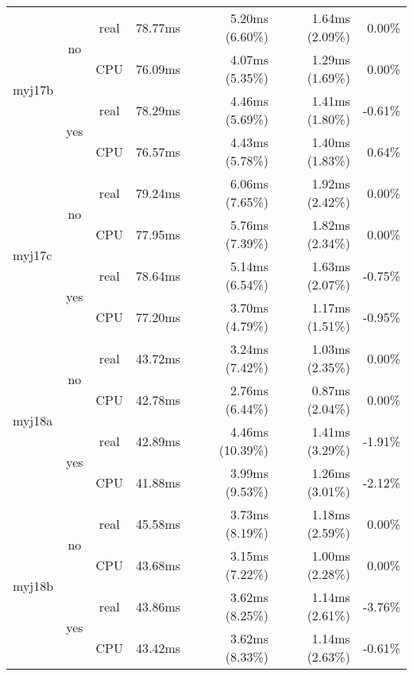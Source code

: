 \documentclass[en]{pracamgr}
\begin{document}
\begin{small}
\begin{longtable}{|l|c|c|r|r|r|r|}
\hline
\multirow{4}{*}{myj17b}   & \multirow{2}{*}{no}  & real & 78.77ms & 5.20ms (6.60\%) & 1.64ms (2.09\%) & 0.00\% \\*
                          &                      & CPU  & 76.09ms & 4.07ms (5.35\%) & 1.29ms (1.69\%) & 0.00\% \\*
                          \cline{2-7}
                          & \multirow{2}{*}{yes} & real & 78.29ms & 4.46ms (5.69\%) & 1.41ms (1.80\%) & -0.61\% \\*
                          &                      & CPU  & 76.57ms & 4.43ms (5.78\%) & 1.40ms (1.83\%) & 0.64\% \\
\hline
\multirow{4}{*}{myj17c}   & \multirow{2}{*}{no}  & real & 79.24ms & 6.06ms (7.65\%) & 1.92ms (2.42\%) & 0.00\% \\*
                          &                      & CPU  & 77.95ms & 5.76ms (7.39\%) & 1.82ms (2.34\%) & 0.00\% \\*
                          \cline{2-7}
                          & \multirow{2}{*}{yes} & real & 78.64ms & 5.14ms (6.54\%) & 1.63ms (2.07\%) & -0.75\% \\*
                          &                      & CPU  & 77.20ms & 3.70ms (4.79\%) & 1.17ms (1.51\%) & -0.95\% \\
\hline
\multirow{4}{*}{myj18a}   & \multirow{2}{*}{no}  & real & 43.72ms & 3.24ms (7.42\%) & 1.03ms (2.35\%) & 0.00\% \\*
                          &                      & CPU  & 42.78ms & 2.76ms (6.44\%) & 0.87ms (2.04\%) & 0.00\% \\*
                          \cline{2-7}
                          & \multirow{2}{*}{yes} & real & 42.89ms & 4.46ms (10.39\%) & 1.41ms (3.29\%) & -1.91\% \\*
                          &                      & CPU  & 41.88ms & 3.99ms (9.53\%) & 1.26ms (3.01\%) & -2.12\% \\
\hline
\multirow{4}{*}{myj18b}   & \multirow{2}{*}{no}  & real & 45.58ms & 3.73ms (8.19\%) & 1.18ms (2.59\%) & 0.00\% \\*
                          &                      & CPU  & 43.68ms & 3.15ms (7.22\%) & 1.00ms (2.28\%) & 0.00\% \\*
                          \cline{2-7}
                          & \multirow{2}{*}{yes} & real & 43.86ms & 3.62ms (8.25\%) & 1.14ms (2.61\%) & -3.76\% \\*
                          &                      & CPU  & 43.42ms & 3.62ms (8.33\%) & 1.14ms (2.63\%) & -0.61\% \\

\end{longtable}
\end{small}
\end{document}
